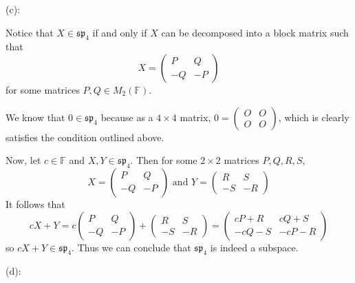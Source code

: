\documentclass{article}
\theoremstyle{plain} %
\numberwithin{thm}{section} %
\theoremstyle{definition}
\begin{document}
\begin{question}{10}
        \medskip

        (c):

        Notice that \(X \in \mathfrak{sp}_4\) if and only if \(X\) can be decomposed into a block matrix such that
        \[
            X = \left( \begin{array}{c|c} P & Q \\ \hline -Q & -P \end{array} \right)
        \]
        for some matrices \(P,Q \in M_2(\mathbb{F})\).

        We know that \(0 \in \mathfrak{sp}_4\) because as a \(4\times 4\) matrix, \(0 = \left( \begin{array}{c|c} O & O \\ \hline O & O \end{array} \right)\), which is clearly satisfies the condition outlined above.

        Now, let \(c \in \mathbb{F}\) and \(X,Y \in \mathfrak{sp}_4\). Then for some \(2\times 2\) matrices \(P,Q,R,S\),
        \[
            X = \left( \begin{array}{c|c} P & Q \\ \hline -Q & -P \end{array} \right) \text{ and } Y = \left( \begin{array}{c|c} R & S \\ \hline -S & -R \end{array} \right)
        \]
        It follows that
        \[
            cX + Y = c\left( \begin{array}{c|c} P & Q \\ \hline -Q & -P \end{array} \right) + \left( \begin{array}{c|c} R & S \\ \hline -S & -R \end{array} \right) = \left( \begin{array}{c|c} cP + R & cQ + S \\ \hline -cQ -S & -cP-R \end{array} \right)
        \]
        so \(cX + Y \in \mathfrak{sp}_4\). Thus we can conclude that \(\mathfrak{sp}_4\) is indeed a subspace.

        \medskip

        (d):


\end{question}
\end{document}
